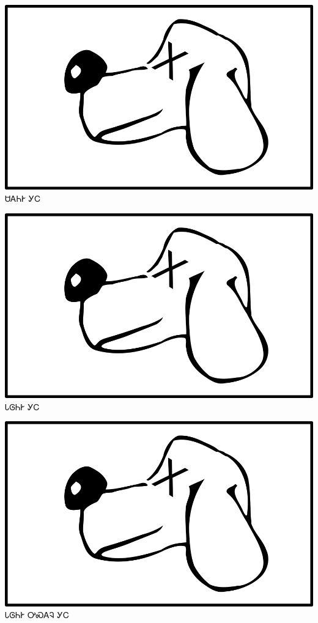 \documentclass[avery5371]{flashcards}%
\begin{document}
\begin{flashcard}{
\includegraphics[width=0.95\columnwidth,height=.51\columnwidth,keepaspectratio]{../artwork/for-colors/gihli-dead}
}\Huge ᏌᎪᏂᎨ ᎩᏟ
\end{flashcard}

\begin{flashcard}{
\includegraphics[width=0.95\columnwidth,height=.51\columnwidth,keepaspectratio]{../artwork/for-colors/gihli-dead}
}\Huge ᏓᎶᏂᎨ ᎩᏟ
\end{flashcard}

\begin{flashcard}{
\includegraphics[width=0.95\columnwidth,height=.51\columnwidth,keepaspectratio]{../artwork/for-colors/gihli-dead}
}\Huge ᏓᎶᏂᎨ ᎤᏍᎪᎸ ᎩᏟ
\end{flashcard}
\end{document}

